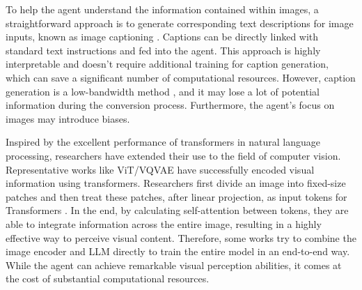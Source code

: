 To help the agent understand the information contained within images, a straightforward approach is to generate corresponding text descriptions for image inputs, known as image captioning \cite{DBLP:conf/iccv/HuangWCW19,DBLP:conf/cvpr/PanYLM20,DBLP:journals/corr/abs-1912-08226,DBLP:journals/corr/abs-2102-10407,DBLP:journals/corr/abs-2305-06355}. Captions can be directly linked with standard text instructions and fed into the agent. This approach is highly interpretable and doesn't require additional training for caption generation, which can save a significant number of computational resources. However, caption generation is a low-bandwidth method \cite{DBLP:conf/icml/DriessXSLCIWTVY23,DBLP:journals/corr/abs-2308-01399}, and it may lose a lot of potential information during the conversion process. Furthermore,  the agent's focus on images may introduce biases.

Inspired by the excellent performance of transformers \cite{DBLP:conf/nips/VaswaniSPUJGKP17} in natural language processing, researchers have extended their use to the field of computer vision. Representative works like ViT/VQVAE \cite{DBLP:conf/iclr/DosovitskiyB0WZ21,DBLP:conf/nips/OordVK17,DBLP:conf/iclr/MehtaR22,DBLP:conf/nips/TolstikhinHKBZU21,DBLP:conf/icml/TouvronCDMSJ21} have successfully encoded visual information using transformers. Researchers first divide an image into fixed-size patches and then treat these patches, after linear projection, as input tokens for Transformers \cite{DBLP:journals/corr/abs-2304-08485}. In the end, by calculating self-attention between tokens, they are able to integrate information across the entire image, resulting in a highly effective way to perceive visual content. Therefore, some works \cite{DBLP:conf/iclr/LuCZMK23} try to combine the image encoder and LLM directly to train the entire model in an end-to-end way. While the agent can achieve remarkable visual perception abilities, it comes at the cost of substantial computational resources.

